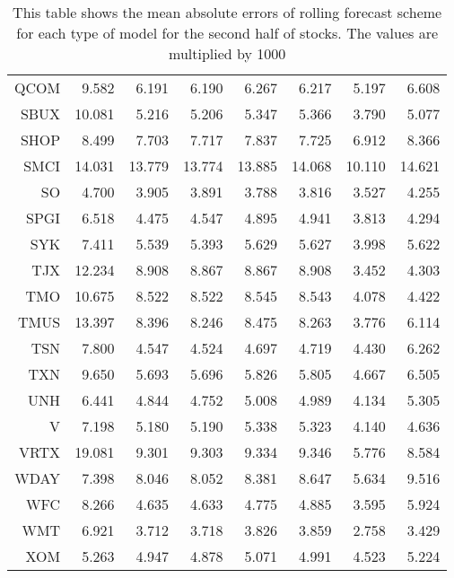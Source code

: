 \begin{table}[ht]
\begin{tabular}{rrrrrrrr}
  QCOM & 9.582 & 6.191 & 6.190 & 6.267 & 6.217 & 5.197 & 6.608 \\ 
  SBUX & 10.081 & 5.216 & 5.206 & 5.347 & 5.366 & 3.790 & 5.077 \\ 
  SHOP & 8.499 & 7.703 & 7.717 & 7.837 & 7.725 & 6.912 & 8.366 \\ 
  SMCI & 14.031 & 13.779 & 13.774 & 13.885 & 14.068 & 10.110 & 14.621 \\ 
  SO & 4.700 & 3.905 & 3.891 & 3.788 & 3.816 & 3.527 & 4.255 \\ 
  SPGI & 6.518 & 4.475 & 4.547 & 4.895 & 4.941 & 3.813 & 4.294 \\ 
  SYK & 7.411 & 5.539 & 5.393 & 5.629 & 5.627 & 3.998 & 5.622 \\ 
  TJX & 12.234 & 8.908 & 8.867 & 8.867 & 8.908 & 3.452 & 4.303 \\ 
  TMO & 10.675 & 8.522 & 8.522 & 8.545 & 8.543 & 4.078 & 4.422 \\ 
  TMUS & 13.397 & 8.396 & 8.246 & 8.475 & 8.263 & 3.776 & 6.114 \\ 
  TSN & 7.800 & 4.547 & 4.524 & 4.697 & 4.719 & 4.430 & 6.262 \\ 
  TXN & 9.650 & 5.693 & 5.696 & 5.826 & 5.805 & 4.667 & 6.505 \\ 
  UNH & 6.441 & 4.844 & 4.752 & 5.008 & 4.989 & 4.134 & 5.305 \\ 
  V & 7.198 & 5.180 & 5.190 & 5.338 & 5.323 & 4.140 & 4.636 \\ 
  VRTX & 19.081 & 9.301 & 9.303 & 9.334 & 9.346 & 5.776 & 8.584 \\ 
  WDAY & 7.398 & 8.046 & 8.052 & 8.381 & 8.647 & 5.634 & 9.516 \\ 
  WFC & 8.266 & 4.635 & 4.633 & 4.775 & 4.885 & 3.595 & 5.924 \\ 
  WMT & 6.921 & 3.712 & 3.718 & 3.826 & 3.859 & 2.758 & 3.429 \\ 
  XOM & 5.263 & 4.947 & 4.878 & 5.071 & 4.991 & 4.523 & 5.224 \\ 
   \hline
\end{tabular}
\caption[MAE rolling forecast (2)]{This table shows the mean absolute errors of rolling forecast scheme for each type of model for the second half of stocks. 
                     The values are multiplied by 1000} 
\label{Table:MAE_r_2}
\end{table}
